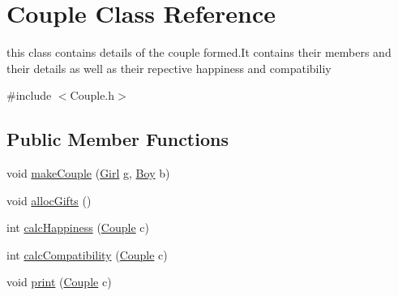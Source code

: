 \hypertarget{classCouple}{}\section{Couple Class Reference}
\label{classCouple}


this class contains details of the couple formed.\+It contains their members and their details as well as their repective happiness and compatibiliy  




{\ttfamily \#include $<$Couple.\+h$>$}

\subsection*{Public Member Functions}
\begin{DoxyCompactItemize}
\item 
void \hyperlink{classCouple_adee904f179b9e3ae04125fc2527b554c}{make\+Couple} (\hyperlink{classGirl}{Girl} g, \hyperlink{classBoy}{Boy} b)
\item 
void \hyperlink{classCouple_a41f18618bc21d4ed6ab1b70916c393a5}{alloc\+Gifts} ()
\item 
int \hyperlink{classCouple_ac0ebef6a48cdfc5f4d2c718fc14881fa}{calc\+Happiness} (\hyperlink{classCouple}{Couple} c)
\item 
int \hyperlink{classCouple_a3b452c0cf8b210140062ed3a9dc7ac3a}{calc\+Compatibility} (\hyperlink{classCouple}{Couple} c)
\item 
void \hyperlink{classCouple_a4e70da8effdcd8cdbf83f42e8cf3aaef}{print} (\hyperlink{classCouple}{Couple} c)
\end{DoxyCompactItemize}
